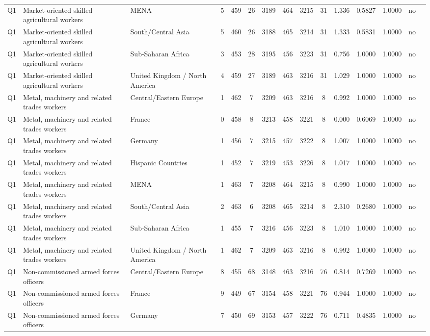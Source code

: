 \begin{longtable}{lllrcccccccccll}
Q1 & Market-oriented skilled agricultural workers & MENA & 5 & 459 & 26 & 3189 & 464 & 3215 & 31 & 1.336 & 0.5827 & 1.0000 & no \\
Q1 & Market-oriented skilled agricultural workers & South/Central Asia & 5 & 460 & 26 & 3188 & 465 & 3214 & 31 & 1.333 & 0.5831 & 1.0000 & no \\
Q1 & Market-oriented skilled agricultural workers & Sub-Saharan Africa & 3 & 453 & 28 & 3195 & 456 & 3223 & 31 & 0.756 & 1.0000 & 1.0000 & no \\
Q1 & Market-oriented skilled agricultural workers & United Kingdom / North America & 4 & 459 & 27 & 3189 & 463 & 3216 & 31 & 1.029 & 1.0000 & 1.0000 & no \\
Q1 & Metal, machinery and related trades workers & Central/Eastern Europe & 1 & 462 & 7 & 3209 & 463 & 3216 & 8 & 0.992 & 1.0000 & 1.0000 & no \\
Q1 & Metal, machinery and related trades workers & France & 0 & 458 & 8 & 3213 & 458 & 3221 & 8 & 0.000 & 0.6069 & 1.0000 & no \\
Q1 & Metal, machinery and related trades workers & Germany & 1 & 456 & 7 & 3215 & 457 & 3222 & 8 & 1.007 & 1.0000 & 1.0000 & no \\
Q1 & Metal, machinery and related trades workers & Hispanic Countries & 1 & 452 & 7 & 3219 & 453 & 3226 & 8 & 1.017 & 1.0000 & 1.0000 & no \\
Q1 & Metal, machinery and related trades workers & MENA & 1 & 463 & 7 & 3208 & 464 & 3215 & 8 & 0.990 & 1.0000 & 1.0000 & no \\
Q1 & Metal, machinery and related trades workers & South/Central Asia & 2 & 463 & 6 & 3208 & 465 & 3214 & 8 & 2.310 & 0.2680 & 1.0000 & no \\
Q1 & Metal, machinery and related trades workers & Sub-Saharan Africa & 1 & 455 & 7 & 3216 & 456 & 3223 & 8 & 1.010 & 1.0000 & 1.0000 & no \\
Q1 & Metal, machinery and related trades workers & United Kingdom / North America & 1 & 462 & 7 & 3209 & 463 & 3216 & 8 & 0.992 & 1.0000 & 1.0000 & no \\
Q1 & Non-commissioned armed forces officers & Central/Eastern Europe & 8 & 455 & 68 & 3148 & 463 & 3216 & 76 & 0.814 & 0.7269 & 1.0000 & no \\
Q1 & Non-commissioned armed forces officers & France & 9 & 449 & 67 & 3154 & 458 & 3221 & 76 & 0.944 & 1.0000 & 1.0000 & no \\
Q1 & Non-commissioned armed forces officers & Germany & 7 & 450 & 69 & 3153 & 457 & 3222 & 76 & 0.711 & 0.4835 & 1.0000 & no \\

\end{longtable}
